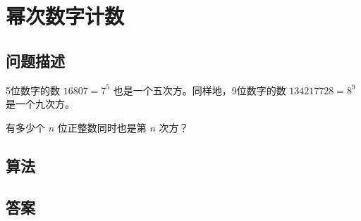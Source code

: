 \section{幂次数字计数}
\subsection{问题描述}
\begin{tcolorbox}
5位数字的数 \( 16807 = 7^5 \) 也是一个五次方。同样地，9位数字的数 \( 134217728 = 8^9 \) 是一个九次方。

有多少个 \( n \) 位正整数同时也是第 \( n \) 次方？
\end{tcolorbox}

\subsection{算法}


\subsection{答案}
